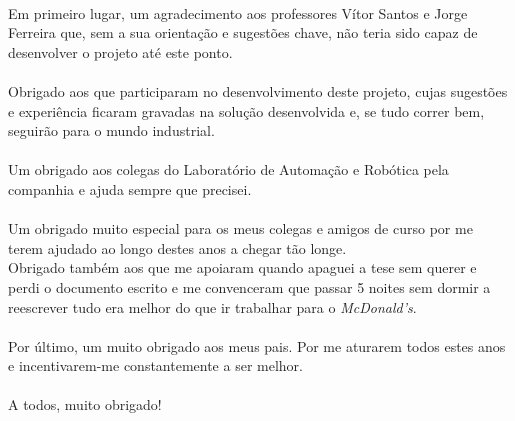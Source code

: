 \documentclass[11pt,twoside,a4paper]{report}
\begin{document}
\titlepage\ \endtitlepage                        %

\TitlePage
  \vspace*{55mm}
       {Em primeiro lugar, um agradecimento aos professores Vítor Santos e Jorge Ferreira que, sem a sua orientação e sugestões chave, não teria sido capaz de desenvolver o projeto até este ponto.\\
        \\
       Obrigado aos que participaram no desenvolvimento deste projeto, cujas sugestões e experiência ficaram gravadas na solução desenvolvida e, se tudo correr bem, seguirão para o mundo industrial.\\
        \\
       Um obrigado aos colegas do Laboratório de Automação e Robótica pela companhia e ajuda sempre que precisei.\\
        \\
       Um obrigado muito especial para os meus colegas e amigos de curso por me terem ajudado ao longo destes anos a chegar tão longe.
        \\
       Obrigado também aos que me apoiaram quando apaguei a tese sem querer e perdi o documento escrito e me convenceram que passar 5 noites sem dormir a reescrever tudo era melhor do que ir trabalhar para o \textit{McDonald's}.\\
        \\
       Por último, um muito obrigado aos meus pais. Por me aturarem todos estes anos e incentivarem-me constantemente a ser melhor.\\
        \\
       A todos, muito obrigado!}
  \TEXT{}
       {}
\EndTitlePage
\titlepage\ \endtitlepage %
\end{document}
